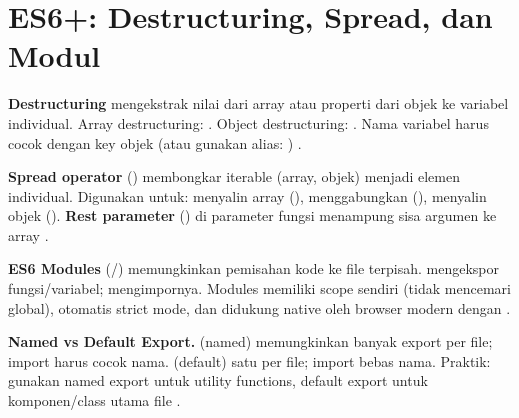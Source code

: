 \section{ES6+: Destructuring, Spread, dan Modul}

\textbf{Destructuring} mengekstrak nilai dari array atau properti dari objek ke variabel individual. Array destructuring: . Object destructuring: . Nama variabel harus cocok dengan key objek (atau gunakan alias: ) \cite{jsInfo}.

\textbf{Spread operator} () membongkar iterable (array, objek) menjadi elemen individual. Digunakan untuk: menyalin array (\code{[...arr]}), menggabungkan (\code{[...a, ...b]}), menyalin objek (). \textbf{Rest parameter} () di parameter fungsi menampung sisa argumen ke array \cite{mdnJsGuide}.

\textbf{ES6 Modules} (/) memungkinkan pemisahan kode ke file terpisah.  mengekspor fungsi/variabel;  mengimpornya. Modules memiliki scope sendiri (tidak mencemari global), otomatis strict mode, dan didukung native oleh browser modern dengan  \cite{jsInfo}.

\begin{konsep}
\textbf{Named vs Default Export.}  (named) memungkinkan banyak export per file; import harus cocok nama.  (default) satu per file; import bebas nama. Praktik: gunakan named export untuk utility functions, default export untuk komponen/class utama file \cite{mdnJsGuide}.
\end{konsep}

